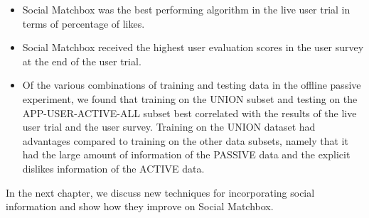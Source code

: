 \begin{itemize}
\item{Social Matchbox was the best performing algorithm in the live user trial in terms of percentage of likes.}

\item{Social Matchbox received the highest user evaluation scores in the user survey at the end of the user trial.}

\item{Of the various combinations of training and testing data in the offline passive experiment, we found that training on the UNION subset and testing on the APP-USER-ACTIVE-ALL subset best correlated with the results of the live user trial and the user survey. Training on the UNION dataset had advantages compared to training on the other data subsets, namely that it had the large amount of information of the PASSIVE data and the explicit dislikes information of the ACTIVE data.}

\end{itemize}

In the next chapter, we discuss new techniques for incorporating social information and show how they improve on Social Matchbox.
